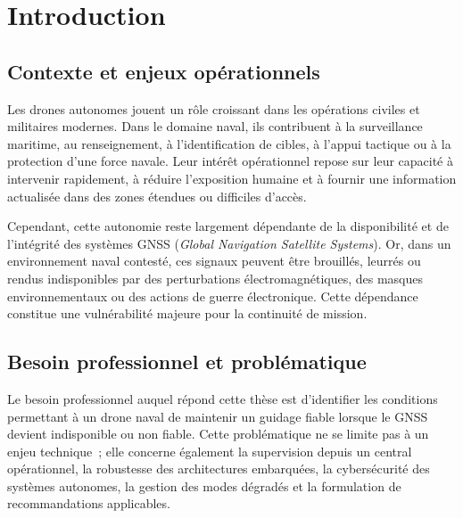 \documentclass[12pt, a4paper, twoside, openright]{report}
\begin{document}
\tableofcontents

\listoffigures
\cleardoublepage

\listoftables
\cleardoublepage


\chapter{Introduction}

\section{Contexte et enjeux opérationnels}

Les drones autonomes jouent un rôle croissant dans les opérations civiles et militaires modernes. Dans le domaine naval, ils contribuent à la surveillance maritime, au renseignement, à l'identification de cibles, à l'appui tactique ou à la protection d'une force navale. Leur intérêt opérationnel repose sur leur capacité à intervenir rapidement, à réduire l'exposition humaine et à fournir une information actualisée dans des zones étendues ou difficiles d'accès.

Cependant, cette autonomie reste largement dépendante de la disponibilité et de l'intégrité des systèmes GNSS (\textit{Global Navigation Satellite Systems}). Or, dans un environnement naval contesté, ces signaux peuvent être brouillés, leurrés ou rendus indisponibles par des perturbations électromagnétiques, des masques environnementaux ou des actions de guerre électronique. Cette dépendance constitue une vulnérabilité majeure pour la continuité de mission.

\section{Besoin professionnel et problématique}

Le besoin professionnel auquel répond cette thèse est d'identifier les conditions permettant à un drone naval de maintenir un guidage fiable lorsque le GNSS devient indisponible ou non fiable. Cette problématique ne se limite pas à un enjeu technique~; elle concerne également la supervision depuis un central opérationnel, la robustesse des architectures embarquées, la cybersécurité des systèmes autonomes, la gestion des modes dégradés et la formulation de recommandations applicables.
\end{document}
